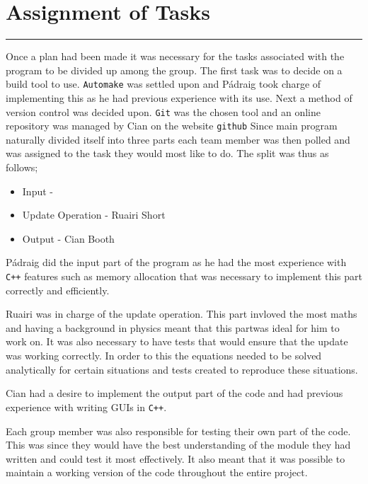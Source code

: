 \section{Assignment of Tasks}
\vspace{-2em}\rule{\textwidth}{1pt}\vspace{1em}

Once a plan had been made it was necessary for the tasks associated with the program to be divided up among the group.
The first task was to decide on a build tool to use.
\texttt{Automake} was settled upon and P\'{a}draig took charge of implementing this as he had previous experience with its use.
Next a method of version control was decided upon.
\texttt{Git} was the chosen tool and an online repository was managed by Cian on the website \texttt{github}
Since main program naturally divided itself into three parts each team member was then polled and was assigned to the task they would most like to do.
The split was thus as follows;
\begin{itemize}
\item Input - \pa
\item Update Operation - Ruairi Short
\item Output - Cian Booth
\end{itemize}

P\'{a}draig did the input part of the program as he had the most experience with \texttt{C++} features such as memory allocation that was necessary to implement this part correctly and efficiently.

Ruairi was in charge of the update operation.
This part invloved the most maths and having a background in physics meant that this partwas ideal for him to work on.
It was also necessary to have tests that would ensure that the update was working correctly.
In order to this the equations needed to be solved analytically for certain situations and tests created to reproduce these situations.

Cian had a desire to implement the output part of the code and had previous experience with writing GUIs in \texttt{C++}.

Each group member was also responsible for testing their own part of the code.
This was since they would have the best understanding of the module they had written and could test it most effectively.
It also meant that it was possible to maintain a working version of the code throughout the entire project.

